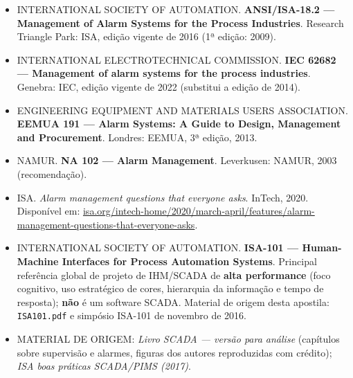 \begin{itemize}
\tightlist
\item
  INTERNATIONAL SOCIETY OF AUTOMATION. \textbf{ANSI/ISA-18.2 --- Management of Alarm Systems for the Process Industries}. Research Triangle Park: ISA, edição vigente de 2016 (1ª edição: 2009).
\item
  INTERNATIONAL ELECTROTECHNICAL COMMISSION. \textbf{IEC 62682 --- Management of alarm systems for the process industries}. Genebra: IEC, edição vigente de 2022 (substitui a edição de 2014).
\item
  ENGINEERING EQUIPMENT AND MATERIALS USERS ASSOCIATION. \textbf{EEMUA 191 --- Alarm Systems: A Guide to Design, Management and Procurement}. Londres: EEMUA, 3ª edição, 2013.
\item
  NAMUR. \textbf{NA 102 --- Alarm Management}. Leverkusen: NAMUR, 2003 (recomendação).
\item
  ISA. \emph{Alarm management questions that everyone asks}. InTech, 2020. Disponível em: \url{isa.org/intech-home/2020/march-april/features/alarm-management-questions-that-everyone-asks}.
\item
  INTERNATIONAL SOCIETY OF AUTOMATION. \textbf{ISA-101 --- Human-Machine Interfaces for Process Automation Systems}. Principal referência global de projeto de IHM/SCADA de \textbf{alta performance} (foco cognitivo, uso estratégico de cores, hierarquia da informação e tempo de resposta); \textbf{não} é um software SCADA. Material de origem desta apostila: \passthrough{\lstinline!ISA101.pdf!} e simpósio ISA-101 de novembro de 2016.
\item
  MATERIAL DE ORIGEM: \emph{Livro SCADA --- versão para análise} (capítulos sobre supervisão e alarmes,
  figuras dos autores reproduzidas com crédito); \emph{ISA boas práticas SCADA/PIMS (2017)}.
\end{itemize}
